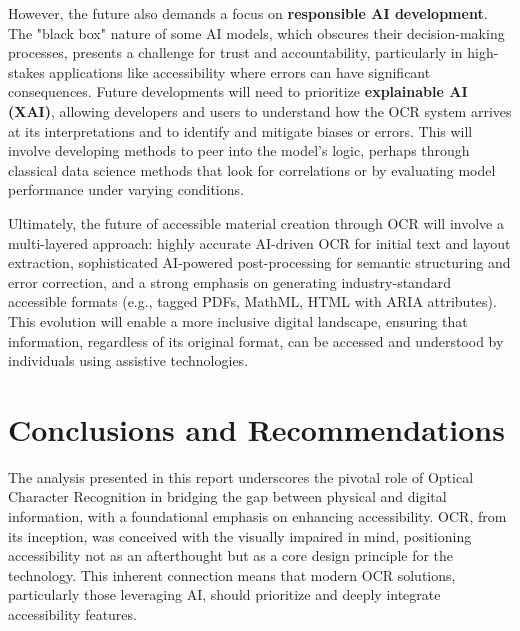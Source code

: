 However, the future also demands a focus on \textbf{responsible AI development}. The "black box" nature of some AI models, which obscures their decision-making processes, presents a challenge for trust and accountability, particularly in high-stakes applications like accessibility where errors can have significant consequences. Future developments will need to prioritize \textbf{explainable AI (XAI)}, allowing developers and users to understand how the OCR system arrives at its interpretations and to identify and mitigate biases or errors. This will involve developing methods to peer into the model's logic, perhaps through classical data science methods that look for correlations or by evaluating model performance under varying conditions.

Ultimately, the future of accessible material creation through OCR will involve a multi-layered approach: highly accurate AI-driven OCR for initial text and layout extraction, sophisticated AI-powered post-processing for semantic structuring and error correction, and a strong emphasis on generating industry-standard accessible formats (e.g., tagged PDFs, MathML, HTML with ARIA attributes). This evolution will enable a more inclusive digital landscape, ensuring that information, regardless of its original format, can be accessed and understood by individuals using assistive technologies.

\section{Conclusions and Recommendations}
\label{sec:ocr-conclusions}

The analysis presented in this report underscores the pivotal role of Optical Character Recognition in bridging the gap between physical and digital information, with a foundational emphasis on enhancing accessibility. OCR, from its inception, was conceived with the visually impaired in mind, positioning accessibility not as an afterthought but as a core design principle for the technology. This inherent connection means that modern OCR solutions, particularly those leveraging AI, should prioritize and deeply integrate accessibility features.

